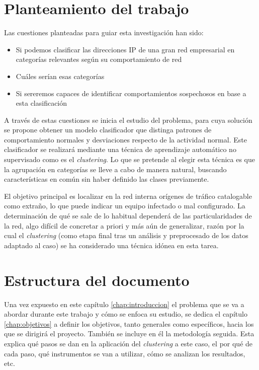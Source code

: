 \section{Planteamiento del trabajo}\label{sec:objetivos}

Las cuestiones planteadas para guiar esta investigación han sido:
\begin{itemize}
    \item Si podemos clasificar las direcciones IP de una gran red empresarial en categorías relevantes según su comportamiento de red
    \item Cuáles serían esas categorías
    \item Si sereremos capaces de identificar comportamientos sospechosos en base a esta clasificación
\end{itemize}

A través de estas cuestiones se inicia el estudio del problema, para cuya solución se propone obtener un modelo clasificador que distinga patrones de comportamiento normales y desviaciones respecto de la actividad normal.
Este clasificador se realizará mediante una técnica de aprendizaje automático no supervisado como es el \emph{clustering}.
Lo que se pretende al elegir esta técnica es que la agrupación en categorías se lleve a cabo de manera natural, buscando características en común sin haber definido las clases previamente.

El objetivo principal es localizar en la red interna orígenes de tráfico catalogable como extraño, lo que puede indicar un equipo infectado o mal configurado.
La determinación de qué se sale de lo habitual dependerá de las particularidades de la red, algo difícil de concretar a priori y más aún de generalizar,
razón por la cual el \emph{clustering} (como etapa final tras un análisis y preprocesado de los datos adaptado al caso) se ha considerado una técnica idónea en esta tarea.

\section{Estructura del documento}\label{sec:estructura}

Una vez expuesto en este capítulo \ref{chap:introduccion} el problema que se va a abordar durante este trabajo y cómo se enfoca su estudio,
se dedica el capítulo \ref{chap:objetivos} a definir los objetivos, tanto generales como específicos, hacia los que se dirigirá el proyecto.
También se incluye en él la metodología seguida.
Esta explica qué pasos se dan en la aplicación del \emph{clustering} a este caso, el por qué de cada paso, qué instrumentos se van a utilizar, cómo se analizan los resultados, etc.

